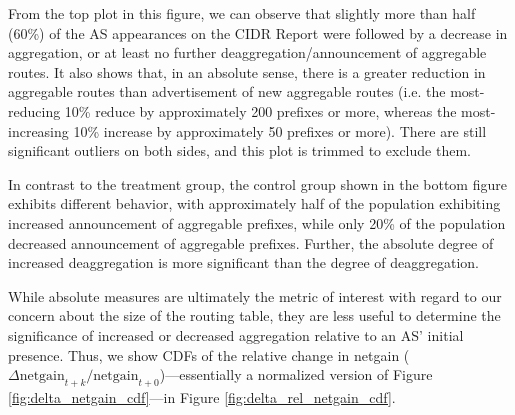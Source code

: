 From the top plot in this figure, we can observe that slightly more than half
(60\%) of the AS appearances on the CIDR Report were followed by a decrease in
aggregation, or at least no further deaggregation/announcement of aggregable
routes. It also shows that, in an absolute sense, there is a greater reduction
in aggregable routes than advertisement of new aggregable routes (i.e. the
most-reducing 10\% reduce by approximately 200 prefixes or more, whereas the
most-increasing 10\% increase by approximately 50 prefixes or more). There are
still significant outliers on both sides, and this plot is trimmed to exclude
them.

In contrast to the treatment group, the control group shown in the bottom
figure exhibits different behavior, with approximately half of the population
exhibiting increased announcement of aggregable prefixes, while only 20\% of
the population decreased announcement of aggregable prefixes. Further, the
absolute degree of increased deaggregation is more significant than the degree
of deaggregation.

While absolute measures are ultimately the metric of interest with regard to
our concern about the size of the routing table, they are less useful to
determine the significance of increased or decreased aggregation relative to
an AS' initial presence. Thus, we show CDFs of the relative change in
netgain ($\Delta\textrm{netgain}_{t+k}/\textrm{netgain}_{t+0}$)---essentially a
normalized version of Figure \ref{fig:delta_netgain_cdf}---in Figure
\ref{fig:delta_rel_netgain_cdf}.

